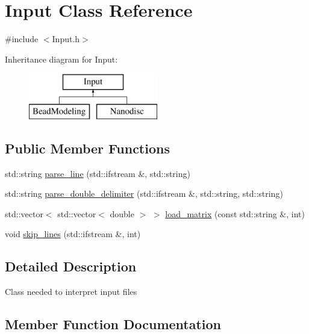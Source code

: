 \hypertarget{class_input}{}\section{Input Class Reference}
\label{class_input}


{\ttfamily \#include $<$Input.\+h$>$}

Inheritance diagram for Input\+:\begin{figure}[H]
\begin{center}
\leavevmode
\includegraphics[height=2.000000cm]{class_input}
\end{center}
\end{figure}
\subsection*{Public Member Functions}
\begin{DoxyCompactItemize}
\item 
std\+::string \mbox{\hyperlink{class_input_a0dda55e6109c2a9e0cea6b845f537e08}{parse\+\_\+line}} (std\+::ifstream \&, std\+::string)
\item 
std\+::string \mbox{\hyperlink{class_input_a8c76cad0ed10a1ab30f81368013e7a49}{parse\+\_\+double\+\_\+delimiter}} (std\+::ifstream \&, std\+::string, std\+::string)
\item 
std\+::vector$<$ std\+::vector$<$ double $>$ $>$ \mbox{\hyperlink{class_input_a8fb5a7daf7254f88800d052ba767d9b6}{load\+\_\+matrix}} (const std\+::string \&, int)
\item 
void \mbox{\hyperlink{class_input_a1881bd785ffd830245fccb22091a53c0}{skip\+\_\+lines}} (std\+::ifstream \&, int)
\end{DoxyCompactItemize}


\subsection{Detailed Description}
Class needed to interpret input files 

\subsection{Member Function Documentation}
\mbox{\label{class_input_a8fb5a7daf7254f88800d052ba767d9b6}} 
